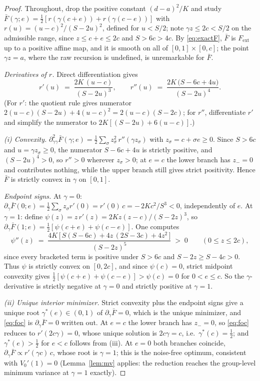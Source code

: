 \documentclass[11pt]{article}
\theoremstyle{remark}
\begin{document}
\begin{proof}
Throughout, drop the positive constant $(d-a)^2/K$ and study
$\bar F(\gamma; e) = \tfrac12[r(\gamma(c+e)) + r(\gamma(c-e))]$ with
$r(u) = (u-c)^2/(S-2u)^2$, defined for $u < S/2$; note
$\gamma z \le 2c < S/2$ on the admissible range, since $z \le c + e \le 2c$
and $S > 6c > 4c$. By \eqref{eq:exactF}, $\bar F$ is $F_{\mathrm{ext}}$ up
to a positive affine map, and it is smooth on all of $[0,1] \times [0,c]$;
the point $\gamma z = a$, where the raw recursion is undefined, is
unremarkable for $\bar F$.

\emph{Derivatives of $r$.} Direct differentiation gives
\[
  r'(u) \;=\; \frac{2K\,(u - c)}{(S - 2u)^3},
  \qquad
  r''(u) \;=\; \frac{2K\,\big(S - 6c + 4u\big)}{(S - 2u)^4}.
\]
(For $r'$: the quotient rule gives numerator
$2(u-c)(S-2u) + 4(u-c)^2 = 2(u-c)(S-2c)$; for $r''$, differentiate $r'$ and
simplify the numerator to $2K[(S-2u) + 6(u-c)]$.)

\emph{(i) Convexity.} $\partial^2_{\gamma\gamma}\bar F(\gamma;e) =
\tfrac12\sum_\sigma z_\sigma^2\, r''(\gamma z_\sigma)$ with
$z_\sigma = c + \sigma e \ge 0$. Since $S > 6c$ and $u = \gamma z_\sigma \ge
0$, the numerator $S - 6c + 4u$ is strictly positive, and $(S-2u)^4 > 0$, so
$r'' > 0$ wherever $z_\sigma > 0$; at $e = c$ the lower branch has
$z_- = 0$ and contributes nothing, while the upper branch still gives strict
positivity. Hence $\bar F$ is strictly convex in $\gamma$ on $[0,1]$.

\emph{Endpoint signs.} At $\gamma = 0$:
$\partial_\gamma \bar F(0; e) = \tfrac12 \sum_\sigma z_\sigma r'(0)
= r'(0)\, c = -\,2Kc^2/S^3 < 0$, independently of $e$. At $\gamma = 1$:
define $\psi(z) = z\, r'(z) = 2K z (z - c)/(S - 2z)^3$, so
$\partial_\gamma \bar F(1; e) = \tfrac12[\psi(c+e) + \psi(c-e)]$. One
computes
\[
  \psi''(z) \;=\; \frac{4K\,\big[\,S(S - 6c) + 4z\,(2S - 3c) + 4z^2\,\big]}
  {(S - 2z)^5} \;>\; 0
  \qquad (0 \le z \le 2c),
\]
since every bracketed term is positive under $S > 6c$ and $S - 2z \ge
S - 4c > 0$. Thus $\psi$ is strictly convex on $[0, 2c]$, and since
$\psi(c) = 0$, strict midpoint convexity gives
$\tfrac12[\psi(c+e) + \psi(c-e)] > \psi(c) = 0$ for $0 < e \le c$. So the
$\gamma$-derivative is strictly negative at $\gamma = 0$ and strictly
positive at $\gamma = 1$.

\emph{(ii) Unique interior minimizer.} Strict convexity plus the endpoint
signs give a unique root $\gamma^*(e) \in (0,1)$ of
$\partial_\gamma \bar F = 0$, which is the unique minimizer, and
\eqref{eq:foc} is $\partial_\gamma \bar F = 0$ written out. At $e = c$ the
lower branch has $z_- = 0$, so \eqref{eq:foc} reduces to
$r'(2c\gamma) = 0$, whose unique solution is $2c\gamma = c$, i.e.\
$\gamma^*(c) = \tfrac12$; and $\gamma^*(e) > \tfrac12$ for $e < c$ follows
from (iii). At $e = 0$ both branches coincide, $\partial_\gamma \bar F
\propto r'(\gamma c)\,c$, whose root is $\gamma = 1$; this is the
noise-free optimum, consistent with $V_0'(1) = 0$ (Lemma~\ref{lem:mv}
applies: the reduction reaches the group-level minimum variance at
$\gamma = 1$ exactly).


\end{proof}
\end{document}
